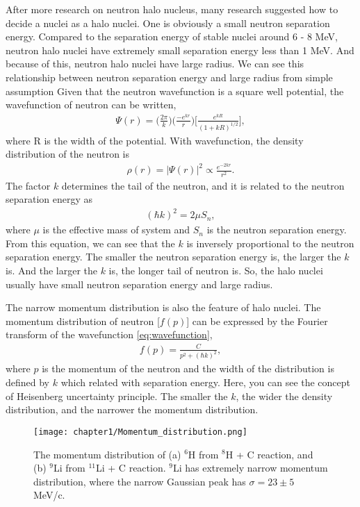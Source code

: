 After more research on neutron halo nucleus, many research suggested how to decide a nuclei as a halo nuclei. One is obviously a small neutron separation energy. Compared to the separation energy of stable nuclei around 6 - 8 MeV, neutron halo nuclei have extremely small separation energy less than 1 MeV. And because of this, neutron halo nuclei have large radius. We can see this relationship between neutron separation energy and large radius from simple assumption  Given that the neutron wavefunction is a square well potential, the wavefunction of neutron can be written,
\begin{align}
    \Psi(r) = \bigg(\frac{2\pi}{k}\bigg)\bigg(\frac{-e^{k r}}{r}\bigg)\bigg[\frac{e^{k R}}{(1+ k R)^{1/2}}\bigg], \label{eq:wavefunction}
\end{align}
where R is the width of the potential. With wavefunction, the density distribution of the neutron is
\begin{align}
    \rho(r) = |\Psi(r)|^2 \propto \frac{e^{-2k r}}{r^2}.
\end{align}
The factor $k$ determines the tail of the neutron, and it is related to the neutron separation energy as
\begin{align}
    (\hbar k)^2 = 2\mu S_n,
\end{align}
where $\mu$ is the effective mass of system and $S_n$ is the neutron separation energy. From this equation, we can see that the $k$ is inversely proportional to the neutron separation energy. The smaller the neutron separation energy is, the larger the $k$ is. And the larger the $k$ is, the longer tail of neutron is. So, the halo nuclei usually have small neutron separation energy and large radius.

The narrow momentum distribution is also the feature of halo nuclei. The momentum distribution of neutron [$f (p)$] can be expressed by the Fourier transform of the wavefunction \ref{eq:wavefunction},
\begin{align}
    f(p) = \frac{C}{p^2+(\hbar k)^2},
\end{align}
where $p$ is the momentum of the neutron and the width of the distribution is defined by $k$ which related with separation energy. Here, you can see the concept of Heisenberg uncertainty principle. The smaller the $k$, the wider the density distribution, and the narrower the momentum distribution. 

\begin{figure}
    \centering
    \texttt{[image: chapter1/Momentum\_distribution.png]}
    \caption[The momentum distribution of ${}^{6}$H and ${}^{9}$Li]{The momentum distribution of (a) ${}^{6}$H from ${}^{8}$H + C reaction, and (b) ${}^{9}$Li from ${}^{11}$Li + C reaction. ${}^{9}$Li has extremely narrow momentum distribution, where the narrow Gaussian peak has $\sigma  = 23 \pm 5$ MeV/c. \cite{Kobayashi88}}
    \label{fig:Momentum_distribution}
\end{figure}


